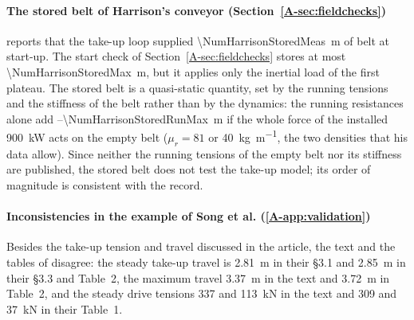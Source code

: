 \paragraph{The stored belt of Harrison's conveyor (Section~\ref{A-sec:fieldchecks})}
 reports that the take-up loop supplied \qty{\NumHarrisonStoredMeas}{\metre}
of belt at start-up. The start check of Section~\ref{A-sec:fieldchecks} stores at most
\qty{\NumHarrisonStoredMax}{\metre}, but it applies only the inertial load of the first plateau.
The stored belt is a quasi-static quantity, set by the running tensions and the stiffness of the
belt rather than by the dynamics: the running resistances alone add
\NumHarrisonStoredRunMin--\qty{\NumHarrisonStoredRunMax}{\metre} if the whole force of the
installed \qty{900}{\kilo\watt} acts on the empty belt ($\mu_r=81$ or
\qty{40}{\kilo\gram\per\metre}, the two densities that his data allow). Since neither the running
tensions of the empty belt nor its stiffness are published, the stored belt does not test the
take-up model; its order of magnitude is consistent with the record.

\paragraph{Inconsistencies in the example of Song et al. (\ref{A-app:validation})}
Besides the take-up tension and travel discussed in the article, the text and the tables of
\citet{song2012} disagree: the steady take-up travel is \qty{2.81}{\metre} in their \S3.1 and
\qty{2.85}{\metre} in their \S3.3 and Table~2, the maximum travel \qty{3.37}{\metre} in the text
and \qty{3.72}{\metre} in Table~2, and the steady drive tensions 337 and \qty{113}{\kilo\newton} in
the text and 309 and \qty{37}{\kilo\newton} in their Table~1.
